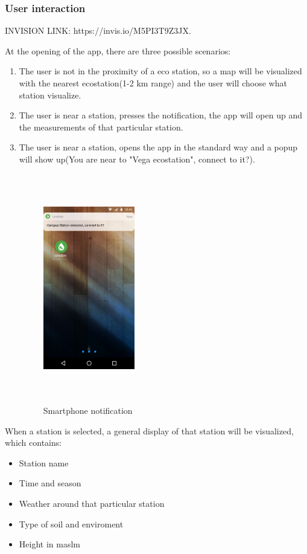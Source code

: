 \documentclass[12pt]{article} %
\begin{document}
\subsubsection{User interaction}
INVISION LINK: https://invis.io/M5PI3T9Z3JX.

At the opening of the app, there are three possible scenarios:
\begin{enumerate}
    \item The user is not in the proximity of a eco station, so a map will be visualized with the nearest ecostation(1-2 km range) and the user will choose what station visualize.
    \item The user is near a station, presses the notification, the app will open up and the measurements of that particular station.
    \item The user is near a station, opens the app in the standard way and a popup will show up(You are near to "Vega ecostation", connect to it?).
  \begin{figure}[H]
  \centering
  \includegraphics[width=4cm,height=10cm,keepaspectratio]{img/notismart.png}
  \caption{Smartphone notification}
  \label{fig:boat1}
\end{figure}
\end{enumerate}


When a station is selected, a general display of that station will be visualized, which contains:
\begin{itemize}
\item Station name
\item Time and season
\item Weather around that particular station
\item Type of soil and enviroment
\item Height in maslm
\end{itemize}
\end{document}
